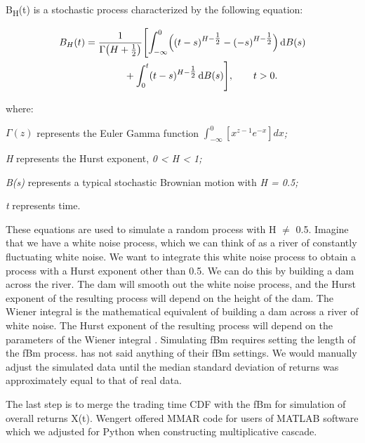 \documentclass[12pt,a4paper]{report}
\numberwithin{equation}{section}
\begin{document}
B\textsubscript{H}(t) is a stochastic process characterized by the
following equation:

\begin{equation}\label{eq:3.1.15}
\begin{aligned}
B_H(t)
&=\frac{1}{\Gamma\!\left(H+\tfrac12\right)}
\Biggl[
\int_{-\infty}^{0}\Bigl((t-s)^{H-\tfrac12}-(-s)^{H-\tfrac12}\Bigr)\,\mathrm{d}B(s) \\
&\qquad\qquad +\int_{0}^{t}(t-s)^{H-\tfrac12}\,\mathrm{d}B(s)
\Biggr],\qquad t>0 .
\end{aligned}
\end{equation}


where:

\(\Gamma(z)\) represents the Euler Gamma function
\(\int_{- \infty}^{0}{\left\lbrack x^{z - 1}e^{- x} \right\rbrack dx}\)\emph{;}

\emph{H} represents the Hurst exponent, \emph{0 \textless{} H
\textless{} 1;}

\emph{B(s)} represents a typical stochastic Brownian motion with \emph{H
= 0.5;}

\emph{t} represents time.

These equations are used to simulate a random process with H $\neq$ 0.5.
Imagine that we have a white noise process, which we can think of as a
river of constantly fluctuating white noise. We want to integrate this
white noise process to obtain a process with a Hurst exponent other than
0.5. We can do this by building a dam across the river. The dam will
smooth out the white noise process, and the Hurst exponent of the
resulting process will depend on the height of the dam. The Wiener
integral is the mathematical equivalent of building a dam across a river
of white noise. The Hurst exponent of the resulting process will depend
on the parameters of the Wiener integral \cite{mandelbrot1977fractal_72}. Simulating fBm
requires setting the length of the fBm process. \cite{mandelbrot1997multifractal_13} has not said
anything of their fBm settings. We would manually adjust the simulated
data until the median standard deviation of returns was approximately
equal to that of real data.

The last step is to merge the trading time CDF with the fBm for
simulation of overall returns X(t). Wengert \cite{wengert2010mmar} offered MMAR code for
users of MATLAB software which we adjusted for Python when constructing
multiplicative cascade.
\end{document}
